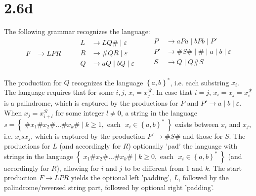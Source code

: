 \documentclass[12pt]{article}
\begin{document}
\section*{2.6d}
The following grammar recognizes the language:
\begin{equation*}
	\begin{split}
F &\longrightarrow LPR
	\end{split}
\quad\quad
	\begin{split}
L &\longrightarrow LQ\# \; | \; \varepsilon \\
R &\longrightarrow \#QR \; | \; \varepsilon\\
Q &\longrightarrow aQ \; | \; bQ \; | \; \varepsilon
	\end{split}
\quad\quad
	\begin{split}
P &\longrightarrow aPa \; | \; bPb \; | \; P'\\
P' &\longrightarrow \#S\# \; | \; \# \; | \; a \; | \; b \; | \; \varepsilon\\
S &\longrightarrow Q \; | \; Q \# S \\
	\end{split}
\end{equation*}

The production for $Q$ recognizes the language $\left\{ a, b \right\}^*$, i.e. each substring $x_i$. The language requires that for some $i,j$, $x_i=x_j^{\mathcal{R}}$. In case that $i=j$, $x_i=x_j=x_i^{\mathcal{R}}$ is a palindrome, which is captured by the productions for $P$ and $P' \rightarrow a \; | \; b \; | \; \varepsilon$. When $x_{j}=x_{i+l}^{\mathcal{R}}$ for some integer $l \neq 0$, a string in the language $s = \left\{ \; \# x_1 \# x_2 \# \hdots \# x_k \# \; | \; k \geq 1,\text{ each  } x_i \in \left\{ a, b \right\}^* \; \right\}$ exists between $x_i$ and $x_j$, i.e. $x_{i} s x_{j}$, which is captured by the production $P' \rightarrow \#S\#$ and those for $S$. The productions for $L$ (and accordingly for $R$) optionally 'pad' the language with strings in the language $\left\{ \; x_1 \# x_2 \# \hdots \# x_k \# \; | \; k \geq 0,\text{ each  } x_i \in \left\{ a, b \right\}^* \; \right\}$ (and accordingly for $R$), allowing for $i$ and $j$ to be different from $1$ and $k$. The start production $F \rightarrow LPR$ yields the optional left 'padding', $L$, followed by the palindrome/reversed string part, followed by optional right 'padding'.
\end{document}
